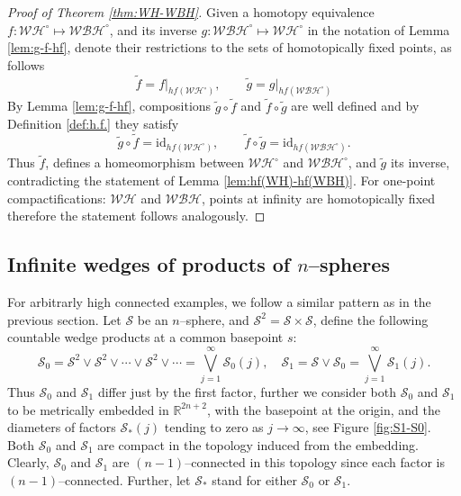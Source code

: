\documentclass[reqno,12pt]{amsart}
\theoremstyle{ourremark}
\numberwithin{equation}{section}
\numberwithin{theorem}{section}
\begin{document}
\begin{proof}[Proof of Theorem \ref{thm:WH-WBH}]
Given a homotopy equivalence $f:\mathcal{WH}^\circ\longmapsto \mathcal{WBH}^\circ$, and its inverse $g:\mathcal{WBH}^\circ\longmapsto \mathcal{WH}^\circ$ in the notation of Lemma \ref{lem:g-f-hf}, denote their restrictions to the sets of homotopically fixed points, as follows
\[
 \tilde{f}=f\bigl|_{hf(\mathcal{WH}^\circ)},\qquad \tilde{g}=g\bigl|_{hf(\mathcal{WBH}^\circ)}
\] 
By Lemma \ref{lem:g-f-hf}, compositions $\tilde{g}\circ\tilde{f}$ and $\tilde{f}\circ\tilde{g}$ are well defined and by Definition \ref{def:h.f.} they satisfy 
\[
 \tilde{g}\circ\tilde{f}=\text{id}_{hf(\mathcal{WH}^\circ)},\qquad  \tilde{f}\circ\tilde{g}=\text{id}_{hf(\mathcal{WBH}^\circ)}.
\]
Thus $\tilde{f}$, defines a homeomorphism between $\mathcal{WH}^\circ$ and $\mathcal{WBH}^\circ$, and $\tilde{g}$ its inverse, contradicting the statement of Lemma \ref{lem:hf(WH)-hf(WBH)}. For one-point compactifications:  $\mathcal{WH}$ and $\mathcal{WBH}$, points at infinity are homotopically fixed therefore the statement follows analogously.
\end{proof}

\subsection{Infinite wedges of products of \texorpdfstring{$n$}{n}--spheres}
For arbitrarly high connected examples, we follow a similar pattern as in the previous section. Let $\mathcal{S}$ be an $n$--sphere, and $\mathcal{S}^2=\mathcal{S}\times \mathcal{S}$, define the following countable 
wedge products at a common basepoint $s$:
\begin{equation}\label{eq:S_0-S_1}
  \mathcal{S}_0 =\mathcal{S}^2\vee\mathcal{S}^2\vee\cdots\vee\mathcal{S}^2\vee\cdots=\bigvee^\infty_{j=1} \mathcal{S}_0(j),\quad 
 \mathcal{S}_1 =\mathcal{S}\vee \mathcal{S}_0=\bigvee^\infty_{j=1} \mathcal{S}_1(j).
\end{equation}
Thus $\mathcal{S}_0$ and $\mathcal{S}_1$ differ just by the first factor, further we consider both $\mathcal{S}_0$ and $\mathcal{S}_1$ to be metrically embedded in ${\mathbb{R}}^{2 n+2}$, with the basepoint at the origin, and the diameters of factors $\mathcal{S}_\ast(j)$ tending to zero as $j\to\infty$, see Figure \ref{fig:S1-S0}. Both $\mathcal{S}_0$ and $\mathcal{S}_1$ are compact in the topology induced from the embedding. Clearly, $\mathcal{S}_0$ and $\mathcal{S}_1$ are $(n-1)$--connected in this topology since each factor is $(n-1)$--connected. Further, let $\mathcal{S}_\ast$ stand for either $\mathcal{S}_0$ or $\mathcal{S}_1$.
\end{document}
